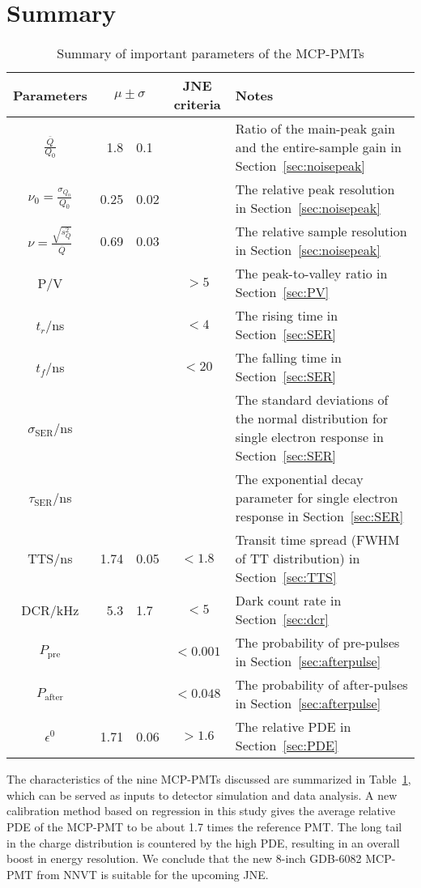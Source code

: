 \section{Summary}
\label{Summary}
\begin{table}
    \centering
    \caption{Summary of important parameters of the MCP-PMTs}
    \label{tab:summary}
    \begin{tabularx}{\textwidth}{c|r @{$\pm$} l |c|X}
        \hline
        Parameters&\multicolumn{2}{c}{$\mu\pm\sigma$}\vline&JNE criteria&Notes\\
        \hline
        $\frac{\overline{Q}}{Q_0}$&1.8&0.1&&Ratio of the main-peak gain and the entire-sample gain in Section~\ref{sec:noisepeak}\\
        $\nu_0=\frac{\sigma_{Q_0}}{Q_0}$&0.25&0.02&&The relative peak resolution in Section~\ref{sec:noisepeak}\\
        $\nu=\frac{\sqrt{s^2_{Q}}}{\overline{Q}}$&0.69&0.03&&The relative sample resolution in Section~\ref{sec:noisepeak}\\
        P/V&&&$>5$&The peak-to-valley ratio in Section~\ref{sec:PV}\\
        $t_r$/ns&&&$<4$&The rising time in Section~\ref{sec:SER}\\
        $t_f$/ns&&&$<20$&The falling time in Section~\ref{sec:SER}\\
        $\sigma_{\mathrm{SER}}$/ns&&&&The standard deviations of the normal distribution for single electron response in Section~\ref{sec:SER}\\
        $\tau_{\mathrm{SER}}$/ns&&&&The exponential decay parameter for single electron response in Section~\ref{sec:SER}\\
        TTS/ns&1.74&0.05&$<1.8$&Transit time spread (FWHM of TT distribution) in Section~\ref{sec:TTS}\\
        DCR/kHz&5.3&1.7&$<5$&Dark count rate in Section~\ref{sec:dcr}\\
        $P_{\mathrm{pre}}$&&&$<0.001$&The probability of pre-pulses in Section~\ref{sec:afterpulse}\\
        $P_{\mathrm{after}}$&&&$<0.048$&The probability of after-pulses in Section~\ref{sec:afterpulse}\\
        $\epsilon^0$&1.71&0.06&$>1.6$&The relative PDE in Section~\ref{sec:PDE}\\
        \hline
    \end{tabularx}
\end{table}

The characteristics of the nine MCP-PMTs discussed are summarized in Table~\ref{tab:summary}, which can be served as inputs to detector simulation and data analysis. A new calibration method based on regression in this study gives the average relative PDE of the MCP-PMT to be about 1.7 times the reference PMT. The long tail in the charge distribution is countered by the high PDE, resulting in an overall boost in energy resolution. We conclude that the new 8-inch GDB-6082 MCP-PMT from NNVT is suitable for the upcoming JNE.